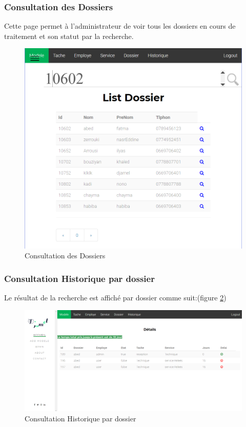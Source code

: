 \subsubsection{Consultation des  Dossiers}
Cette page permet à l'administrateur de voir tous les dossiers en cours de traitement et son statut par la recherche.
\begin{figure}[H]
	\centering
	\includegraphics[width=0.7\linewidth]{images/captures/capturesadmin/dossier}
	\caption{Consultation des  Dossiers}
	\label{fig:dossier}
\end{figure}

\subsubsection{ Consultation Historique par dossier }
Le résultat de la recherche est affiché par dossier comme suit:(figure \ref{fig:historique})
\begin{figure}[H]
	\centering
	\includegraphics[width=1\linewidth]{images/captures/capturesadmin/historique}
	\caption{Consultation Historique par dossier }
	\label{fig:historique}
\end{figure}

